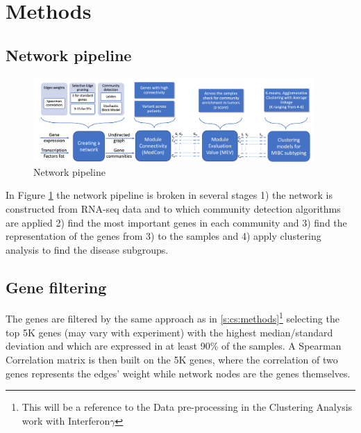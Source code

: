 \section{Methods} \label{s:N_I:methods}

\subsection{Network pipeline}



\begin{figure}
    \centering
    \includegraphics[width=0.95\textwidth,height=0.95\textheight,keepaspectratio]{Sections/Network_I/Resources/Methods/network_pipeline.png}
    \caption{Network pipeline}
    \label{fig:N_I:network_pipeline}
\end{figure}


In Figure \ref{fig:N_I:network_pipeline} the network pipeline is broken in several stages 1) the network is constructed from RNA-seq data and to which community detection algorithms are applied 2) find the most important genes in each community and 3) find the representation of the genes from 3) to the samples and 4) apply clustering analysis to find the disease subgroups.


\subsection{Gene filtering}
The genes are filtered by the same approach as in \cref{s:cs:methods}\footnote{This will be a reference to the Data pre-processing in the Clustering Analysis work with Interferon$\gamma$} selecting the top 5K genes (may vary with experiment) with the highest median/standard deviation and which are expressed in at least 90\% of the samples. A Spearman Correlation matrix is then built on the 5K genes, where the correlation of two genes represents the edges' weight while network nodes are the genes themselves. 

